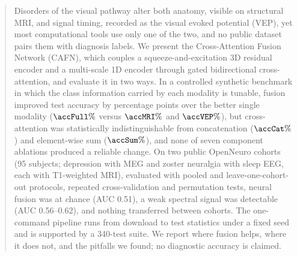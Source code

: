 \begin{abstract}
Disorders of the visual pathway alter both anatomy, visible on structural MRI, and signal timing, recorded as the visual evoked potential (VEP), yet most computational tools use only one of the two, and no public dataset pairs them with diagnosis labels. We present the Cross-Attention Fusion Network (CAFN), which couples a squeeze-and-excitation 3D residual encoder and a multi-scale 1D encoder through gated bidirectional cross-attention, and evaluate it in two ways. In a controlled synthetic benchmark in which the class information carried by each modality is tunable, fusion improved test accuracy by \gainUni{} percentage points over the better single modality ($\accFull\%$ versus $\accMRI\%$ and $\accVEP\%$), but cross-attention was statistically indistinguishable from concatenation ($\accCat\%$) and element-wise sum ($\accSum\%$), and none of seven component ablations produced a reliable change. On two public OpenNeuro cohorts (95 subjects; depression with MEG and zoster neuralgia with sleep EEG, each with T1-weighted MRI), evaluated with pooled and leave-one-cohort-out protocols, repeated cross-validation and permutation tests, neural fusion was at chance (AUC 0.51), a weak spectral signal was detectable (AUC 0.56--0.62), and nothing transferred between cohorts. The one-command pipeline runs from download to test statistics under a fixed seed and is supported by a 340-test suite. We report where fusion helps, where it does not, and the pitfalls we found; no diagnostic accuracy is claimed.
\end{abstract}
